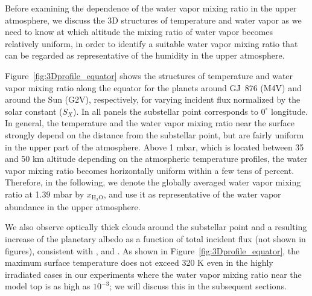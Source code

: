 \documentclass[11pt,numberedappendix,twocolappendix,]{emulateapj}
\def\water{H$_2$O}
\def\xwater{$x_\text{\water}$}
\def\preslevel{1.39 mbar}
\def\wv{water vapor}
\begin{document}
Before examining the dependence of the \wv{} mixing ratio in the upper atmosphere, we discuss the 3D structures of temperature and water vapor as we need to know at which altitude the mixing ratio of \wv{} becomes relatively uniform, in order to identify a suitable \wv{} mixing ratio that can be regarded as representative of the humidity in the upper atmosphere. 

Figure~\ref{fig:3Dprofile_equator} shows the structures of temperature and  \wv{} mixing ratio along the equator for the planets around GJ~876 (M4V) and around the Sun (G2V), respectively, for varying incident flux normalized by the solar constant ($S_X$). 
In all panels the substellar point corresponds to $0^{\circ }$ longitude. 
In general, the temperature and the \wv{} mixing ratio near the surface strongly depend on the distance from the substellar point, but are fairly uniform in the upper part of the atmosphere. 
Above 1 mbar, which is located between 35 and 50 km altitude depending on the atmospheric temperature profiles, the \wv{} mixing ratio becomes horizontally uniform within a few tens of percent. 
Therefore, in the following, we denote the globally averaged \wv{} mixing ratio at \preslevel{} by \xwater{}, and use it as representative of the \wv{} abundance in the upper atmosphere. 

We also observe optically thick clouds around the substellar point and a resulting increase of the planetary albedo as a function of total incident flux (not shown in figures), consistent with \citet{Yang2013,Yang2014}, \citet{Kopparapu2016} and \citet{Way2016}. 
As shown in Figure~\ref{fig:3Dprofile_equator}, the maximum surface temperature does not exceed 320 K even in the highly irradiated cases in our experiments where the \wv{} mixing ratio near the model top is as high as $10^{-3}$; we will discuss this in the subsequent sections. 
\end{document}
